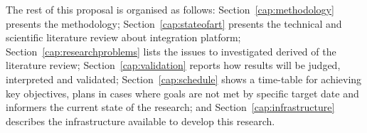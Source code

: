 The rest of this proposal is organised as follows: Section~\ref{cap:methodology} presents the methodology; Section~\ref{cap:stateofart} presents the technical and scientific literature review about integration platform; Section~\ref{cap:researchproblems} lists the issues to investigated derived of the literature review; Section~\ref{cap:validation} reports how results will be judged, interpreted and validated; Section~\ref{cap:schedule} shows a time-table for achieving key objectives, plans in cases where goals are not met by specific target date and informers the current state of the research; and Section~\ref{cap:infrastructure} describes the infrastructure available to develop this research.
